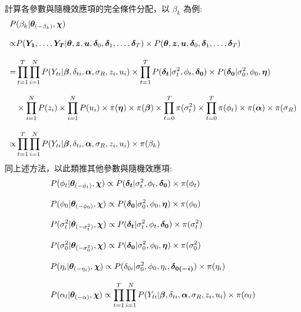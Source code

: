 \documentclass[12pt,a4paper]{article}
\begin{document}
\begin{CJK}{UTF8}{bkai}
\begin{align*}
 \end{align*}
計算各參數與隨機效應項的完全條件分配，以 $\beta_k$ 為例:
 \begin{align*}
 \setlength\abovedisplayskip{25pt}
 \setlength\belowdisplayskip{25pt}
 P & (\beta_k|\bm{\theta}_{(-\beta_k)},\bm{\chi}) \\[3mm]
  \propto &
 P(\bm{Y_1},\dots,\bm{Y_T}|\bm{\theta},\bm{z},\bm{u},\bm{\delta}_0,\bm{\delta}_1,\dots,\bm{\delta}_T) \times
 P(\bm{\theta},\bm{z},\bm{u},\bm{\delta}_0,\bm{\delta}_1,\dots,\bm{\delta}_T) \\[3mm]
  = &
 \prod_{t=1}^T\prod_{i=1}^N P(Y_{ti}|\bm{\beta},\delta_{ti},\bm{\alpha},\sigma_R,z_i,u_i) \times \prod_{t=1}^T P(\bm{\delta_t}|\sigma_t^2,\phi_t,\bm{\delta_0}) \times P(\bm{\delta_0}|\sigma_0^2,\phi_0,\bm{\eta}) \\[3mm]
 & \times
 \prod_{i=1}^N P(z_i) \times \prod_{i=1}^N P(u_i) \times \pi(\bm{\eta}) \times \pi(\bm{\beta}) \times \prod_{t=0}^T \pi(\sigma_t^2) \times \prod_{t=0}^T \pi(\phi_t) \times \pi(\bm{\alpha}) \times \pi(\sigma_R) \\[3mm]
  \propto &
 \prod_{t=1}^T \prod_{i=1}^N P(Y_{ti}|\bm{\beta},\delta_{ti},\bm{\alpha},\sigma_R,z_i,u_i) \times \pi(\beta_k) \\
 \end{align*}
同上述方法，以此類推其他參數與隨機效應項:%
 \begin{align*}
 \setlength\abovedisplayskip{25pt}
 \setlength\belowdisplayskip{25pt}
  P & (\phi_t|\bm{\theta}_{(-\phi_t)},\bm{\chi}) \propto  P(\bm{\delta_{t}}|\sigma_t^2,\phi_t,\bm{\delta_0}) \times \pi(\phi_t) \\[3mm]
  P & (\phi_0|\bm{\theta}_{(-\phi_0)},\bm{\chi}) \propto  P(\bm{\delta_{0}}|\sigma_0^2,\phi_0,\bm{\eta}) \times \pi(\phi_0) \\[3mm]
  P & (\sigma_t^2|\bm{\theta}_{(-\sigma_t^2)},\bm{\chi}) \propto  P(\bm{\delta_{t}}|\sigma_t^2,\phi_t,\bm{\delta_0}) \times \pi(\sigma_t^2) \\[3mm]
  P & (\sigma_0^2|\bm{\theta}_{(-\sigma_0^2)},\bm{\chi}) \propto  P(\bm{\delta_{0}}|\sigma_0^2,\phi_0,\bm{\eta}) \times \pi(\sigma_0^2) \\[3mm]
 P & (\eta_i|\bm{\theta}_{(-\eta_i)},\bm{\chi}) \propto P(\delta_{0i}|\sigma_0^2,\phi_0,\eta_i,\bm{\delta_{0(-i)}}) \times \pi(\eta_i) \\[3mm]
 P & (\alpha_l|\bm{\theta}_{(-\alpha)},\bm{\chi}) \propto \prod_{t=1}^T \prod_{i=1}^N P(Y_{ti}|\bm{\beta},\delta_{ti},\bm{\alpha},\sigma_R,z_i,u_i) \times \pi(\alpha_l) \\[3mm]

\end{align*}
\end{CJK}
\end{document}
